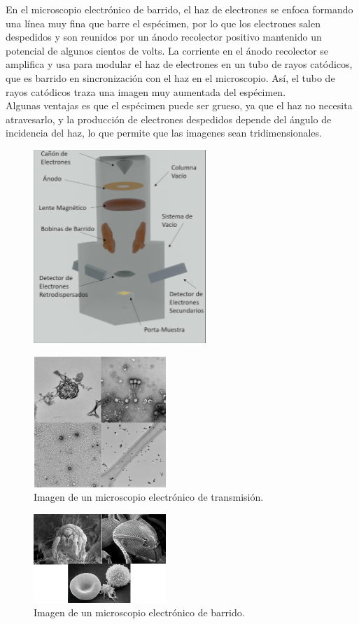 \documentclass[a4paper]{article}
\begin{document}
    \indent En el microscopio electrónico de barrido, el haz de electrones se enfoca formando una línea muy fina que barre el espécimen, por lo que los electrones salen despedidos y son reunidos por un ánodo recolector positivo mantenido un potencial de algunos cientos de volts. La corriente en el ánodo recolector se amplifica y usa para modular el haz de electrones en un tubo de rayos catódicos, que es barrido en sincronización con el haz en el microscopio. Así, el tubo de rayos catódicos traza una imagen muy aumentada del espécimen.\\

    \indent Algunas ventajas es que el espécimen puede ser grueso, ya que el haz no necesita atravesarlo, y la producción de electrones despedidos depende del ángulo de incidencia del haz, lo que permite que las imagenes sean tridimensionales.\\

    \begin{figure}[h!]
        \centering
        \includegraphics[width = 6.5cm]{../microbarrido.png}
    \end{figure}
    \begin{figure}[h!]
        \centering
        \includegraphics[width = 5cm]{../microtrans.png}
        \captionsetup{labelformat=empty}
        \caption{Imagen de un microscopio electrónico de transmisión.}

    \end{figure}
    \begin{figure}
        \centering
        \captionsetup{labelformat=empty}
        \includegraphics[width = 5cm]{../barrido.png}
        \caption*{Imagen de un microscopio electrónico de barrido.}
    \end{figure}
\end{document}
